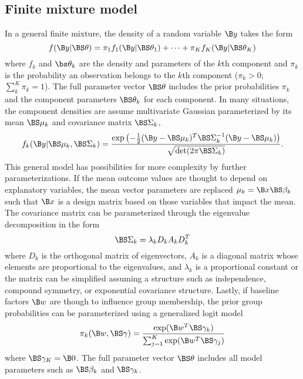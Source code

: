 \subsection{Finite mixture model}
In a general finite mixture, the density of a random variable $\B y$ takes the form
$$f(\B y|\BS\theta)=\pi_{1}f_{1}(\B y|\BS\theta_1)+\cdots+\pi_{K}f_{K}(\B y|\BS\theta_K)$$
where $f_k$ and $\bs\theta_k$ are the density and parameters of the $k$th component and $\pi_{k}$ is the probability an observation belongs to the $k$th component ($\pi_{k}>0$; $\sum^{K}_{k}\pi_{k}=1$). The full parameter vector $\BS\theta$ includes the prior probabilities $\pi_k$ and the component parameters $\BS\theta_k$ for each component. In many situations, the component densities are assume multivariate Gaussian parameterized by its mean $\BS\mu_{k}$ and covariance matrix $\BS\Sigma_{k}$,
$$f_k(\B y| \BS\mu_k,\BS\Sigma_k) = \frac{\exp\left(-\frac{1}{2}(\B y - \BS\mu_k)^T\BS\Sigma_k^{-1}(\B y-\BS\mu_k)\right)}{\sqrt{\det(2\pi \BS\Sigma_k)}}.$$
This general model has possibilities for more complexity by further parameterizations. If the mean outcome values are thought to depend on explanatory variables, the mean vector parameters are replaced $\mu_k = \B x \BS \beta_k$ such that $\B x$ is a design matrix based on those variables that impact the mean. The covariance matrix can be parameterized through the eigenvalue decomposition in the form
$$\BS\Sigma_k=\lambda_k D_kA_kD_k^T$$
where $D_k$ is the orthogonal matrix of eigenvectors, $A_k$ is a diagonal matrix whose elements are proportional to the eigenvalues, and $\lambda_k$ is a proportional constant \cite{banfield1993} or the matrix can be simplified assuming a structure such as independence, compound symmetry, or exponential covariance structure. Lastly, if baseline factors $\B w$ are though to influence group membership, the prior group probabilities can be parameterized using a generalized logit model
$$\pi_k(\B w,\BS\gamma)= \frac{\exp(\B w^T \BS \gamma_k) }{\sum_{j=1}^K \exp(\B w^T \BS \gamma_j)}$$
where $\BS\gamma_{K}=\B 0$. The full parameter vector $\BS\theta$ includes all model parameters such as $\BS\beta_k$ and $\BS\gamma_k$.

